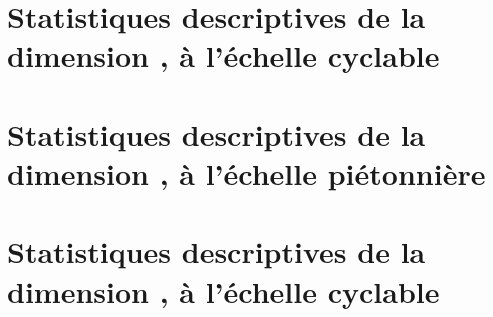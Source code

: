 \section{Statistiques descriptives de la dimension , à l'échelle cyclable}
    \label{annexes:npart-place-ci}


\section{Statistiques descriptives de la dimension , à l'échelle piétonnière}
    \label{annexes:npart-accessibility-pi}


\section{Statistiques descriptives de la dimension , à l'échelle cyclable}
    \label{annexes:npart-accessibility-ci}

